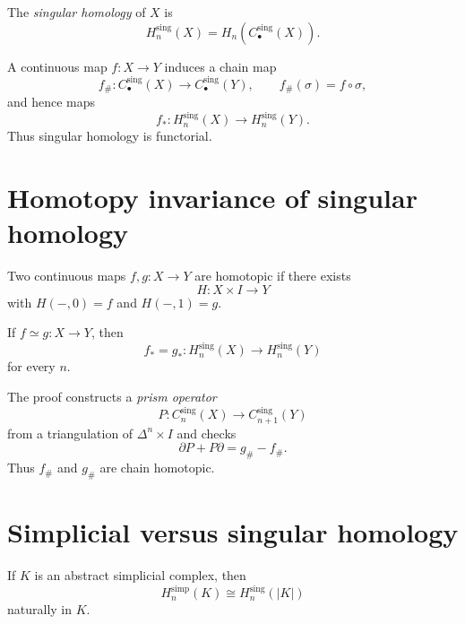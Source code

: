 \begin{definition}
\label{definition-singular-homology}
The {\it singular homology} of $X$ is
\[
H_n^{\operatorname{sing}}(X)
=
H_n(C_\bullet^{\operatorname{sing}}(X)).
\]
\end{definition}

\begin{proposition}
\label{proposition-singular-homology-functor}
A continuous map $f:X\to Y$ induces a chain map
\[
f_\#:C_\bullet^{\operatorname{sing}}(X)
\longrightarrow
C_\bullet^{\operatorname{sing}}(Y),
\qquad
f_\#(\sigma)=f\circ\sigma,
\]
and hence maps
\[
f_*:H_n^{\operatorname{sing}}(X)
\longrightarrow H_n^{\operatorname{sing}}(Y).
\]
Thus singular homology is functorial.
\end{proposition}

\section{Homotopy invariance of singular homology}
\label{section-homotopy-invariance-singular}

\begin{definition}
\label{definition-homotopy-maps}
Two continuous maps $f,g:X\to Y$ are homotopic if
there exists
\[
H:X\times I\longrightarrow Y
\]
with $H(-,0)=f$ and $H(-,1)=g$.
\end{definition}

\begin{theorem}
\label{theorem-homotopy-invariance-singular}
If $f\simeq g:X\to Y$, then
\[
f_*=g_*:
H_n^{\operatorname{sing}}(X)
\longrightarrow
H_n^{\operatorname{sing}}(Y)
\]
for every $n$.
\end{theorem}

\noindent
The proof constructs a {\it prism operator}
\[
P:C_n^{\operatorname{sing}}(X)
\longrightarrow
C_{n+1}^{\operatorname{sing}}(Y)
\]
from a triangulation of
$\Delta^n\times I$ and checks
\[
\partial P+P\partial=g_\#-f_\#.
\]
Thus $f_\#$ and $g_\#$ are chain homotopic.

\section{Simplicial versus singular homology}
\label{section-simplicial-versus-singular}

\begin{theorem}
\label{theorem-simplicial-singular-agree}
If $K$ is an abstract simplicial complex, then
\[
H_n^{\operatorname{simp}}(K)
\cong
H_n^{\operatorname{sing}}(|K|)
\]
naturally in $K$.
\end{theorem}

